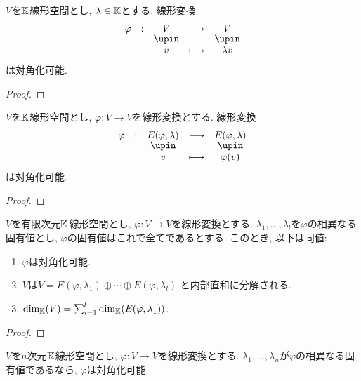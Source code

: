 \begin{lemma}
  $V$を$\mathbb{K}$線形空間とし,
  $\lambda\in\mathbb{K}$とする.
  線形変換
  \begin{align*}
    \shazo{\varphi}{V}{V}
    {v}{\lambda v}
  \end{align*}
  は対角化可能.
\end{lemma}
\begin{proof}\end{proof}
\begin{lemma}
  $V$を$\mathbb{K}$線形空間とし,
  $\varphi\colon V\to V$を線形変換とする.
  線形変換
  \begin{align*}
    \shazo{\varphi}{E(\varphi,\lambda)}{E(\varphi,\lambda)}
    {v}{\varphi(v)}
  \end{align*}
  は対角化可能.
\end{lemma}
\begin{proof}\end{proof}
\begin{prop}
  $V$を有限次元$\mathbb{K}$線形空間とし,
  $\varphi\colon V\to V$を線形変換とする.
  $\lambda_1,\ldots,\lambda_l$を$\varphi$の相異なる固有値とし,
  $\varphi$の固有値はこれで全てであるとする.
  このとき, 以下は同値:
  \begin{enumerate}
  \item $\varphi$は対角化可能.
  \item $V$は$V=E(\varphi,\lambda_1)\oplus\cdots \oplus E(\varphi,\lambda_l)$
    と内部直和に分解される.
  \item $\dim_{\mathbb{K}}(V)=\sum_{i=1}^{l} \dim_{\mathbb{K}}(E(\varphi,\lambda_1))$.
  \end{enumerate}
\end{prop}
\begin{proof}\end{proof}

\begin{cor}
  $V$を$n$次元$\mathbb{K}$線形空間とし,
  $\varphi\colon V\to V$を線形変換とする.
  $\lambda_1,\ldots,\lambda_n$が$\varphi$の相異なる固有値であるなら,
  $\varphi$は対角化可能.  
\end{cor}

